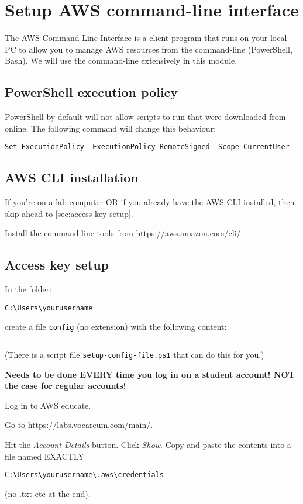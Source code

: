 \documentclass{pgnotes}
\begin{document}
\section{Setup AWS command-line interface}

The AWS Command Line Interface is a client program that runs on your local PC to allow you to manage AWS resources from the command-line (PowerShell, Bash).
We will use the command-line extensively in this module.

\subsection{PowerShell execution policy}

PowerShell by default will not allow scripts to run that were downloaded from online.
The following command will change this behaviour: 
\begin{verbatim}
Set-ExecutionPolicy -ExecutionPolicy RemoteSigned -Scope CurrentUser
\end{verbatim}

\subsection{AWS CLI installation}

If you're on a lab computer OR if you already have the AWS CLI installed, then skip ahead to \autoref{sec:access-key-setup}.

Install the command-line tools from \url{https://aws.amazon.com/cli/}

\subsection{Access key setup}
\label{sec:access-key-setup}

In the folder:
\begin{verbatim}
C:\Users\yourusername
\end{verbatim}
create a file \texttt{config} (no extension) with the following content:
\inputminted{text}{config}
(There is a script file \texttt{setup-config-file.ps1} that can do this for you.)

\textbf{Needs to be done EVERY time you log in on a student account! NOT the case for regular accounts!}

Log in to AWS educate.

Go to \url{https://labs.vocareum.com/main/}.

Hit the \textit{Account Details} button.
Click \textit{Show}.
Copy and paste the contents into a file named EXACTLY 
\begin{verbatim}
C:\Users\yourusername\.aws\credentials
\end{verbatim}
(no .txt etc at the end). 
\end{document}
